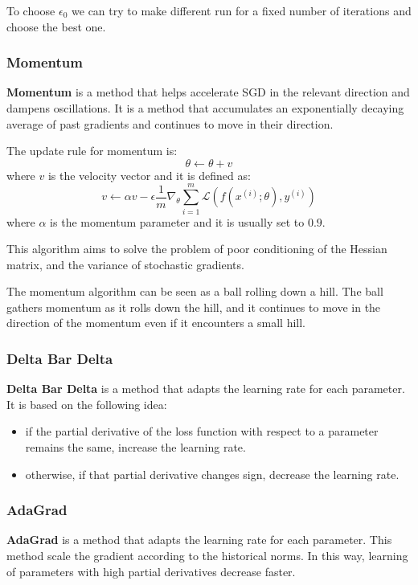 To choose $\epsilon_0$ we can try to make different run for a fixed number of
iterations and choose the best one.
\subsubsection{Momentum}
\textbf{Momentum} is a method that helps accelerate SGD in the relevant direction
and dampens oscillations. It is a method that accumulates an exponentially decaying
average of past gradients and continues to move in their direction.

The update rule for momentum is:
\begin{equation}
    \theta \gets \theta + v
\end{equation}
where $v$ is the velocity vector and it is defined as:
\begin{equation}
    v \gets \alpha v - \epsilon \frac{1}{m} \nabla_\theta \sum_{i=1}^m \mathcal{L}(f(x^{(i)}; \theta), y^{(i)})
\end{equation}
where $\alpha$ is the momentum parameter and it is usually set to $0.9$.

This algorithm aims to solve the problem of poor conditioning of the Hessian
matrix, and the variance of stochastic gradients.

The momentum algorithm can be seen as a ball rolling down a hill. The ball
gathers momentum as it rolls down the hill, and it continues to move in the
direction of the momentum even if it encounters a small hill.
\subsubsection{Delta Bar Delta}
\textbf{Delta Bar Delta} is a method that adapts the learning rate for each
parameter. It is based on the following idea:
\begin{itemize}
    \item if the partial derivative of the loss function with respect to a
          parameter remains the same, increase the learning rate.
    \item otherwise, if that partial derivative changes sign, decrease
          the learning rate.
\end{itemize}
\subsubsection{AdaGrad}
\textbf{AdaGrad} is a method that adapts the learning rate for each parameter.
This method scale the gradient according to the historical norms. In this way,
learning of parameters with high partial derivatives decrease faster.

